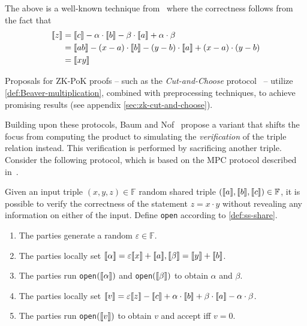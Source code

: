 \documentclass[11pt]{report}
\theoremstyle{definition}
\theoremstyle{plain}
\begin{document}
The above is a well-known technique from~\cite{Beaver1992efficient} where the correctness follows from the fact that
\begin{align*}
  \llbracket z \rrbracket & = \llbracket c \rrbracket - \alpha \cdot \llbracket b \rrbracket - \beta \cdot \llbracket a \rrbracket + \alpha \cdot \beta        \\
         & = \llbracket ab \rrbracket - (x - a) \cdot \llbracket b \rrbracket - (y - b) \cdot \llbracket a \rrbracket + (x - a) \cdot (y - b) \\
         & = \llbracket xy \rrbracket
\end{align*}

Proposals for ZK-PoK proofs -- such as the \textit{Cut-and-Choose} protocol~\cite{katz2018improved,baum2020concretely} -- utilize \autoref{def:Beaver-multiplication}, combined with preprocessing techniques, to achieve promising results (see appendix \autoref{sec:zk-cut-and-choose}).

Building upon these protocols, Baum and Nof~\cite{baum2020concretely} propose a variant that shifts the focus from computing the product to simulating the \textit{verification} of the triple relation instead. This verification is performed by sacrificing another triple. Consider the following protocol, which is based on the MPC protocol described in~\cite{damgaard2012multiparty}.


\begin{protocol}\label{def:sacrifice}
  Given an input triple $(x,y,z) \in \mathbb{F}$ random shared triple $(\llbracket a \rrbracket, \llbracket b \rrbracket, \llbracket c \rrbracket) \in \mathbb{F}$, it is possible to verify the correctness of the statement $z = x \cdot y$ without revealing any information on either of the input. Define \texttt{open} according to \autoref{def:ss-share}.
  \begin{enumerate}[parsep=0pt, itemsep=0pt, topsep=0pt]
    \item The parties generate a random $\varepsilon \in \mathbb{F}$.
    \item The parties locally set $\llbracket \alpha \rrbracket = \varepsilon\llbracket x \rrbracket + \llbracket a \rrbracket, \llbracket \beta \rrbracket = \llbracket y \rrbracket + \llbracket b \rrbracket$.
    \item The parties run \texttt{open}$(\llbracket \alpha \rrbracket)$ and \texttt{open}$(\llbracket \beta \rrbracket)$ to obtain $\alpha$ and $\beta$.
    \item The parties locally set $\llbracket v \rrbracket = \varepsilon\llbracket z \rrbracket - \llbracket c \rrbracket + \alpha  \cdot \llbracket b \rrbracket + \beta  \cdot \llbracket a \rrbracket - \alpha  \cdot \beta$.
    \item The parties run \texttt{open}$(\llbracket v \rrbracket)$ to obtain $v$ and accept iff $v = 0$.
  \end{enumerate}
\end{protocol}
\end{document}
